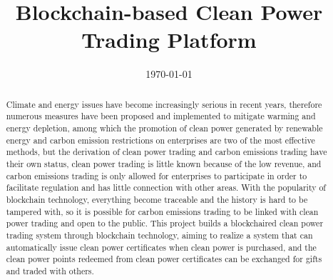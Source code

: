 \documentclass{ecsthesis}      %
\begin{document}
\frontmatter
\title      {Blockchain-based Clean Power Trading Platform}

\date       {\today}

\subject    {Software Engineering}
\maketitle
\begin{abstract}
Climate and energy issues have become increasingly serious in recent years, therefore numerous measures have been proposed and implemented to mitigate warming and energy depletion, among which the promotion of clean power generated by renewable energy and carbon emission restrictions on enterprises are two of the most effective methods, but the derivation of clean power trading and carbon emissions trading have their own status, clean power trading is little known because of the low revenue, and carbon emissions trading is only allowed for enterprises to participate in order to facilitate regulation and has little connection with other areas. With the popularity of blockchain technology, everything become traceable and the history is hard to be tampered with, so it is possible for carbon emissions trading to be linked with clean power trading and open to the public. This project builds a blockchaired clean power trading system through blockchain technology, aiming to realize a system that can automatically issue clean power certificates when clean power is purchased, and the clean power points redeemed from clean power certificates can be exchanged for gifts and traded with others.
\end{abstract}
\end{document}
